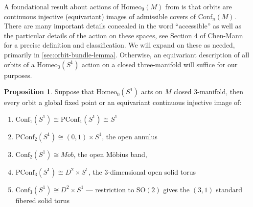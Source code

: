 \documentclass[10pt, oneside]{article}
\newcommand{\SO}[1][2]{\text{SO}(#1)}
\newcommand{\homeo}[1][S^1]{\text{Homeo}_0(#1)}
\newcommand{\conf}[2][S^1]{\text{Conf}_{#2}(#1)}
\newcommand{\pconf}[2][S^1]{\text{PConf}_{#2}(#1)}
\theoremstyle{definition}
\newtheorem{prop}{Proposition}[section]
\theoremstyle{definition}
\begin{document}
A foundational result about actions of $\homeo[M]$ from \cite{chen_structure_2023} is that orbits are continuous injective (equivariant) images of admissible covers of $\conf[M]{n}$. There are many important details concealed in the word ``accessible'' as well as the particular details of the action on these spaces, see Section 4 of Chen-Mann\cite{chen_structure_2023} for a precise definition and classification. We will expand on these as needed, primarily in \cref{sec:orbit-bundle-lemma}. Otherwise, an equivariant description of all orbits of a $\homeo$ action on a closed three-manifold will suffice for our purposes.
\pagebreak
\begin{prop}\label{prop:orbit-computation}
    Suppose that $\homeo$ acts on $M$ closed 3-manifold, then every orbit a global fixed point or an equivariant continuous injective image of:
    \begin{enumerate}
        \item $\conf[S^1]{1} \cong \pconf[S^1]{1}\cong S^1$
        \item $\pconf[S^1]{2} \cong (0,1)\times S^1$, the open annulus
        \item $\conf[S^1]{2} \cong M\ddot{o}b$, the open M\"{o}bius band,
        \item $\pconf[S^1]{3} \cong D^2\times S^1$, the 3-dimensional open solid torus
        \item $\conf[S^1]{3} \cong D^2\times S^1$ --- restriction to $\SO$ gives the $(3, 1)$ standard fibered solid torus
    \end{enumerate}
\end{prop}
\end{document}

